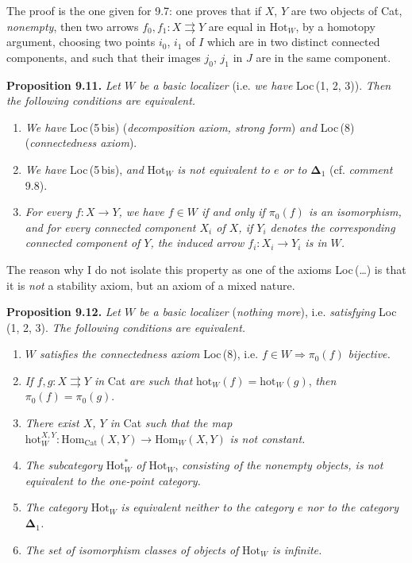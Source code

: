 \documentclass[11pt]{article}
\newcommand{\msp}[1]{\marginpar{\footnotesize [#1]}}
\newcommand{\Hot}{\mathrm{Hot}}
\newcommand{\Hom}{\mathrm{Hom}}
\newcommand{\Cat}{\mathrm{Cat}}
\newcommand{\hot}{\mathrm{hot}}
\begin{document}
\msp{page 133}The proof is the one given for 9.7: one proves that if $X$, $Y$ are two objects of Cat, \textit{nonempty}, then two arrows $f_0,f_1:X\rightrightarrows Y$ are equal in $\Hot_W$, by a homotopy argument, choosing two points $i_0$, $i_1$ of $I$ which are in two distinct connected components, and such that their images $j_0$, $j_1$ in $J$ are in the same component.

\textbf{Proposition 9.11.} \textit{Let $W$ be a basic localizer} (i.e. \textit{we have} Loc\,(1, 2, 3)). \textit{Then the following conditions are equivalent.}
\begin{enumerate}[leftmargin=*]
\item[a)] \textit{We have} Loc\,(5\,bis) (\textit{decomposition axiom, strong form}) \textit{and} Loc\,(8) (\textit{connectedness axiom}).
\item[b)] \textit{We have} Loc\,(5\,bis), \textit{and} $\Hot_W$ \textit{is not equivalent to $e$ or to $\boldsymbol{\Delta}_1$} (cf. \textit{comment} 9.8).
\item[c)] \textit{For every $f:X\longrightarrow Y$, we have $f\in W$ if and only if $\pi_0(f)$ is an isomorphism, and for every connected component $X_i$ of $X$, if $Y_i$ denotes the corresponding connected component of $Y$, the induced arrow $f_i:X_i\longrightarrow Y_i$ is in $W$.}
\end{enumerate}

The reason why I do not isolate this property as one of the axioms Loc\,(\ldots) is that it is \textit{not} a stability axiom, but an axiom of a mixed nature.

\msp{page 133 bis}\textbf{Proposition 9.12.} \textit{Let $W$ be a basic localizer} (\textit{nothing more}), i.e. \textit{satisfying} Loc\,(1, 2, 3). \textit{The following conditions are equivalent.}
\begin{enumerate}[leftmargin=*]
\item[a)] \textit{$W$ satisfies the connectedness axiom} Loc\,(8), i.e. $f\in W\Longrightarrow\pi_0(f)$ \textit{bijective.}
\item[b)] \textit{If $f,g:X\rightrightarrows Y$ in} Cat \textit{are such that} $\hot_W(f)=\hot_W(g)$, \textit{then} $\pi_0(f)=\pi_0(g)$.
\item[c)] \textit{There exist $X$, $Y$ in} Cat \textit{such that the map} $\hot_W^{X,Y}:\Hom_{\Cat}(X,Y)\longrightarrow\Hom_W(X,Y)$ \textit{is not constant.}
\item[c$'$)] \textit{The subcategory} $\Hot_W^*$ \textit{of} $\Hot_W$, \textit{consisting of the nonempty objects, is not equivalent to the one-point category.}
\item[c$''$)] \textit{The category} $\Hot_W$ \textit{is equivalent neither to the category $e$ nor to the category $\boldsymbol{\Delta}_1$.}
\item[d)] \textit{The set of isomorphism classes of objects of} $\Hot_W$ \textit{is infinite.}
\end{enumerate}
\end{document}
